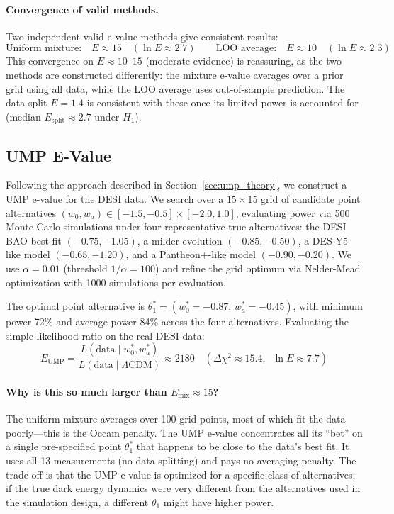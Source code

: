 \documentclass[11pt,a4paper]{article}
\newcommand{\LCDM}{$\Lambda$CDM}
\begin{document}
\paragraph{Convergence of valid methods.} Two independent valid e-value methods give consistent results:
\begin{equation}
\text{Uniform mixture:} \quad E \approx 15 \quad (\ln E \approx 2.7) \qquad \text{LOO average:} \quad E \approx 10 \quad (\ln E \approx 2.3)
\end{equation}
This convergence on $E \approx 10$--$15$ (moderate evidence) is reassuring, as the two methods are constructed differently: the mixture e-value averages over a prior grid using all data, while the LOO average uses out-of-sample prediction. The data-split $E = 1.4$ is consistent with these once its limited power is accounted for (median $E_{\text{split}} \approx 2.7$ under $H_1$).

\subsection{UMP E-Value}
\label{sec:ump}

Following the approach described in Section~\ref{sec:ump_theory}, we construct a UMP e-value for the DESI data. We search over a $15 \times 15$ grid of candidate point alternatives $(w_0, w_a) \in [-1.5, -0.5] \times [-2.0, 1.0]$, evaluating power via 500 Monte Carlo simulations under four representative true alternatives: the DESI BAO best-fit $(-0.75, -1.05)$, a milder evolution $(-0.85, -0.50)$, a DES-Y5-like model $(-0.65, -1.20)$, and a Pantheon+-like model $(-0.90, -0.20)$. We use $\alpha = 0.01$ (threshold $1/\alpha = 100$) and refine the grid optimum via Nelder-Mead optimization with 1000 simulations per evaluation.

The optimal point alternative is $\theta_1^* = (w_0^* = -0.87,\, w_a^* = -0.45)$, with minimum power 72\% and average power 84\% across the four alternatives. Evaluating the simple likelihood ratio on the real DESI data:
\begin{equation}
E_{\text{UMP}} = \frac{L(\text{data} \mid w_0^*, w_a^*)}{L(\text{data} \mid \text{\LCDM})} \approx 2180 \quad (\Delta\chi^2 \approx 15.4, \;\; \ln E \approx 7.7)
\label{eq:ump}
\end{equation}

\paragraph{Why is this so much larger than $E_{\text{mix}} \approx 15$?} The uniform mixture averages over 100 grid points, most of which fit the data poorly---this is the Occam penalty. The UMP e-value concentrates all its ``bet'' on a single pre-specified point $\theta_1^*$ that happens to be close to the data's best fit. It uses all 13 measurements (no data splitting) and pays no averaging penalty. The trade-off is that the UMP e-value is optimized for a specific class of alternatives; if the true dark energy dynamics were very different from the alternatives used in the simulation design, a different $\theta_1$ might have higher power.
\end{document}
